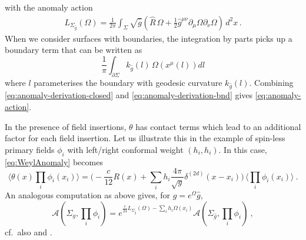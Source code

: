 \documentclass[11pt,a4paper]{article}
\numberwithin{equation}{section}
\begin{document}
%
with the anomaly action
%
\begin{align}\label{eq:anomaly-derivation-closed}
    L_{\Sigma_{\hat{g}}}(\Omega) = \frac{1}{2\pi} \int_\Sigma \sqrt{\hat{g}} \left( \hat{R}\, \Omega + \frac{1}{2}\hat{g}^{\mu\nu}\partial_\mu\Omega \partial_\nu \Omega \right)\,d^2x\,.%
\end{align}
%
When we consider surfaces with boundaries, the integration by parts picks up a boundary term that can be written as
%
\begin{equation}\label{eq:anomaly-derivation-bnd}
    \frac{1}{\pi} \int_{\partial\Sigma} k_{\hat{g}}(l)\, \Omega\!\left(x^\mu(l)\right) dl
\end{equation}
%
where $l$ parameterises the boundary with geodesic curvature $k_{\hat{g}}(l)$. 
Combining \eqref{eq:anomaly-derivation-closed} and \eqref{eq:anomaly-derivation-bnd} gives \eqref{eq:anomaly-action}.

\smallskip
In the presence of field insertions, $\theta$ has contact terms which lead to an additional factor for each field insertion.
Let us illustrate this in the example of spin-less primary fields $\phi_i$ with left/right conformal weight $(h_i,h_i)$. In this case, \eqref{eq:WeylAnomaly} becomes
\begin{equation}\label{eq:contact-aux1}
\Big\langle \theta(x) \prod_i\phi_i(x_i) \Big\rangle = \Big( - \frac{c}{12} R(x) +
\sum_i h_i\frac{4\pi}{\sqrt{g}}\delta^{(2d)}(x-x_i) \Big)
\, \Big\langle \prod_i\phi_i(x_i) \Big\rangle \ .
\end{equation}
An analogous computation as above gives, for $g = e^{\Omega} \hat g$,
\begin{equation}\label{eq:contact-aux2}
\mathcal{A}(\Sigma_{g},\prod_i \phi_i) = e^{\frac{c}{24}L_{\Sigma_{\hat{g}}}(\Omega) - \sum_i h_i \Omega(x_i)} \mathcal{A}(\Sigma_{\hat{g}},\prod_i \phi_i)
\ ,
\end{equation}
cf.\ also \cite[Eqn.\,(13.50)]{Zamolodchikov:2007} and \cite[Eqn.\,(1.3)]{Kupiainen:2019fhf}.
\end{document}

